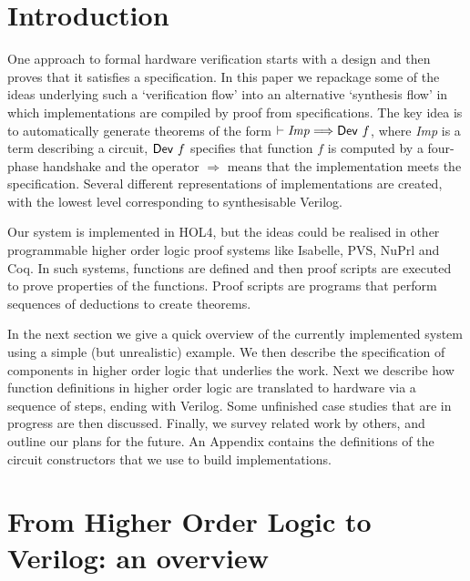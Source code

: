 \documentclass{llncs}
\begin{document}
\section{Introduction}
\label{secIntroduction}
One approach to formal hardware verification starts with a design and
then proves that it satisfies a specification.  In this paper we
repackage some of the ideas underlying such a `verification flow' into
an alternative `synthesis flow' in which implementations are compiled
by proof from specifications.  
The key idea is to
automatically generate theorems of the form $\vdash
{\it{Imp}}\Longrightarrow\mathsf{Dev}~f$, where {\it{Imp}} is a term
describing a circuit, $\mathsf{Dev}~f$ specifies that function $f$ is
computed by a four-phase handshake and the operator $\Longrightarrow$
means that the implementation meets the specification.  Several
different representations of implementations are created, with the
lowest level corresponding to synthesisable Verilog.


Our system is implemented in HOL4, but the ideas could be
realised in other programmable higher order logic proof systems like
Isabelle, PVS, NuPrl and Coq. In such systems, functions are defined
and then proof scripts are executed to prove properties of
the functions.  Proof scripts are programs that perform sequences of
deductions to create theorems.

In the next section we give a quick overview of the currently
implemented system using a simple (but unrealistic) example. We then
describe the specification of components in higher order logic that
underlies the work. Next we describe how function definitions in
higher order logic are translated to hardware via a sequence of steps,
ending with Verilog.  Some unfinished case studies that are in
progress are then discussed. Finally, we survey related work by
others, and outline our plans for the future. An Appendix contains the
definitions of the circuit constructors that we use to build
implementations.

\vspace*{-3mm}



\section{From Higher Order Logic to Verilog: an overview}
\label{secHOL2Verilog}
\vspace*{-2mm}
\end{document}
